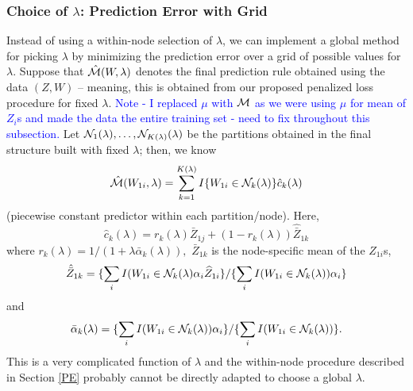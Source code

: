 \documentclass[12pt]{article}
\begin{document}





\subsubsection{Choice of $\lambda$: Prediction Error with Grid }
\label{PE-grid}

Instead of using a within-node selection of $\lambda$, we can implement a global
method for picking $\lambda$ by minimizing the prediction error over a grid of possible values for $\lambda$. 
Suppose that $\hat{\cal M}(W,\lambda)$ denotes the final prediction
rule obtained using the data $(Z, W)$ -- meaning, this is obtained from our proposed
penalized loss procedure for fixed $\lambda.$ \textcolor{blue}{Note - I replaced $\mu$ with $\cal M$ as we were using $\mu$ for mean of $Z_i$s and made the data the entire training set  - need to fix throughout this subsection.}
Let ${\cal N}_1(\lambda), \ldots, {\cal N}_{K(\lambda)}(\lambda)$ be the
partitions obtained in the final structure built with fixed $\lambda$; 
then, we know
\[
\hat{\cal M}(W_{1i},\lambda) = \sum_{k=1}^{K(\lambda)} I\{W_{1i} \in {\cal
  N}_k(\lambda)\} \hat c_k(\lambda)
\]
(piecewise constant predictor within each partition/node).  Here,
 \[
\hat{c}_{k}(\lambda) =
r_{k}(\lambda) \bar{Z}_{1j} + (1-r_k(\lambda)) \hat{\bar{Z}}_{1k}
\]
where $r_k(\lambda) = 1/(1 + \lambda \bar{\alpha}_k(\lambda)),$ 
$\bar{Z}_{1k}$ is the node-specific mean
of the $Z_{1i}$s,
\[
\hat{\bar{Z}}_{1k}=
\{ \sum_i I(W_{1i} \in {\cal N}_k(\lambda) \alpha_i  \widehat{Z}_{1i}  \}
/ \{ \sum_i I(W_{1i} \in {\cal N}_k(\lambda)) \alpha_i \}
\]
and
\[
\bar{\alpha}_{k}(\lambda) =  \{ \sum_i I(W_{1i} \in  {\cal N}_k(\lambda)) \alpha_i \} /
\{ \sum_i I(W_{1i} \in  {\cal N}_k(\lambda))  \}. 
\]
This is a very complicated function of $\lambda$ and the within-node
procedure described in Section \ref{PE} probably cannot be directly
adapted to choose a global $\lambda$.
\end{document}
